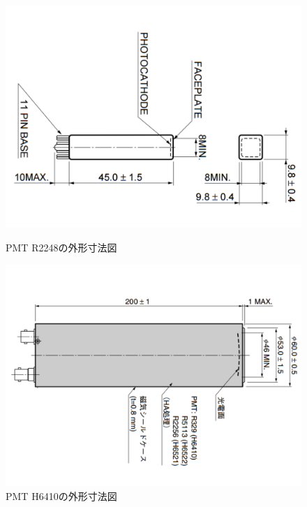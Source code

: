 \begin{figure}[htbp]
\begin{minipage}{0.5\hsize}
\centering
\includegraphics[keepaspectratio,angle=90,scale=0.4]{fig/ybm/pmtmini.pdf}
	\caption{PMT R2248の外形寸法図\cite{pmtshape}}
\label{fig:pmtmini}
\end{minipage}
\begin{minipage}{0.5\hsize}
\centering
\includegraphics[keepaspectratio,angle=90,scale=0.4]{fig/ybm/pmtbig.pdf}
	\caption{PMT H6410の外形寸法図\cite{pmtshape}}
\label{fig:pmtbig}
\end{minipage}
\end{figure}



